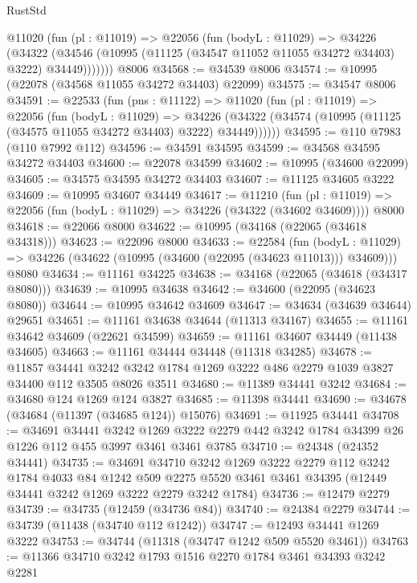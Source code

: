 \begin{lexlean}{RustStd}
\begin{coremodule}
      @11020
        (fun (pl : @11019) =>
        @22056
          (fun (bodyL : @11029) =>
          @34226
            (@34322
              (@34546 (@10995 (@11125 (@34547 @11052 @11055 @34272 @34403) @3222) @34449)))))))
    @8006
@34568 := @34539 @8006
@34574 := @10995 (@22078 (@34568 @11055 @34272 @34403) @22099)
@34575 := @34547 @8006
@34591 := @22533
    (fun (pns : @11122) =>
    @11020
      (fun (pl : @11019) =>
      @22056
        (fun (bodyL : @11029) =>
        @34226 (@34322 (@34574 (@10995 (@11125 (@34575 @11055 @34272 @34403) @3222) @34449))))))
@34595 := @110 @7983 (@110 @7992 @112)
@34596 := @34591 @34595
@34599 := @34568 @34595 @34272 @34403
@34600 := @22078 @34599
@34602 := @10995 (@34600 @22099)
@34605 := @34575 @34595 @34272 @34403
@34607 := @11125 @34605 @3222
@34609 := @10995 @34607 @34449
@34617 := @11210
    (fun (pl : @11019) => @22056 (fun (bodyL : @11029) => @34226 (@34322 (@34602 @34609))))
    @8000
@34618 := @22066 @8000
@34622 := @10995 (@34168 (@22065 (@34618 @34318)))
@34623 := @22096 @8000
@34633 := @22584
    (fun (bodyL : @11029) => @34226 (@34622 (@10995 (@34600 (@22095 (@34623 @11013))) @34609)))
    @8080
@34634 := @11161 @34225
@34638 := @34168 (@22065 (@34618 (@34317 @8080)))
@34639 := @10995 @34638
@34642 := @34600 (@22095 (@34623 @8080))
@34644 := @10995 @34642 @34609
@34647 := @34634 (@34639 @34644) @29651
@34651 := @11161 @34638 @34644 (@11313 @34167)
@34655 := @11161 @34642 @34609 (@22621 @34599)
@34659 := @11161 @34607 @34449 (@11438 @34605)
@34663 := @11161 @34444 @34448 (@11318 @34285)
@34678 := @11857
    @34441
    @3242
    @3242
    @1784
    @1269
    @3222
    @486
    @2279
    @1039
    @3827
    @34400
    @112
    @3505
    @8026
    @3511
@34680 := @11389 @34441 @3242
@34684 := @34680 @124 @1269 @124 @3827
@34685 := @11398 @34441
@34690 := @34678 (@34684 (@11397 (@34685 @124)) @15076)
@34691 := @11925 @34441
@34708 := @34691
    @34441
    @3242
    @1269
    @3222
    @2279
    @442
    @3242
    @1784
    @34399
    @26
    @1226
    @112
    @455
    @3997
    @3461
    @3461
    @3785
@34710 := @24348 (@24352 @34441)
@34735 := @34691
    @34710
    @3242
    @1269
    @3222
    @2279
    @112
    @3242
    @1784
    @4033
    @84
    @1242
    @509
    @2275
    @5520
    @3461
    @3461
    @34395
    (@12449 @34441 @3242 @1269 @3222 @2279 @3242 @1784)
@34736 := @12479 @2279
@34739 := @34735 (@12459 (@34736 @84))
@34740 := @24384 @2279
@34744 := @34739 (@11438 (@34740 @112 @1242))
@34747 := @12493 @34441 @1269 @3222
@34753 := @34744 (@11318 (@34747 @1242 @509 @5520 @3461))
@34763 := @11366 @34710 @3242 @1793 @1516 @2270 @1784 @3461 @34393 @3242 @2281

\end{coremodule}
\end{lexlean}
